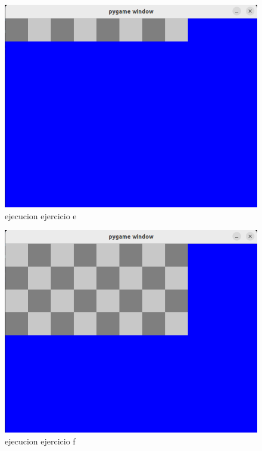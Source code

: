 \documentclass{article}
\begin{document}
\begin{figure}[H]
    \centering
    \includegraphics[scale=0.3]{img/capturaEjercicio2e.png}
    \caption{ejecucion ejercicio e}
\end{figure}
\begin{figure}[H]
    \centering
    \includegraphics[scale=0.3]{img/capturaEjercicio2f.png}
    \caption{ejecucion ejercicio f}
\end{figure}
\end{document}
